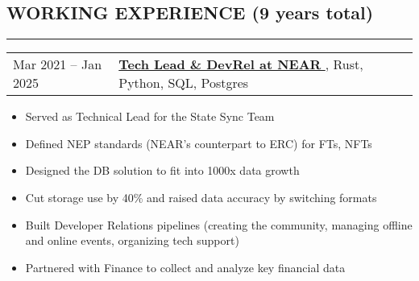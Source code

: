 \documentclass[11pt]{res} %
\let\orighref\href
\renewcommand{\href}[2]{\orighref{#1}{#2\,\faExternalLink}}
\begin{document}
\begin{resume}

        \section{\uppercase{Working Experience} (9 years total)}
        \begin{spacing}{0.3}
            \textcolor[RGB]{220,220,220}{\rule{\linewidth}{0.4pt}}
        \end{spacing}

         \begin{tabular}{ll}
            Mar 2021 -- Jan 2025 \qquad & \textbf{\href{https://near.org}{Tech Lead \& DevRel at NEAR}}, Rust, Python, SQL, Postgres \\
        \end{tabular}

        \begin{itemize} \itemsep -2pt
            \item Served as Technical Lead for the State Sync Team
            \item Defined NEP standards (NEAR’s counterpart to ERC) for FTs, NFTs
            \item Designed the DB solution to fit into 1000x data growth
            \item Cut storage use by 40\% and raised data accuracy by switching formats
            \item Built Developer Relations pipelines (creating the community, managing offline and online events, organizing tech support)
            \item Partnered with Finance to collect and analyze key financial data
        \end{itemize}


\end{resume}
\end{document}
